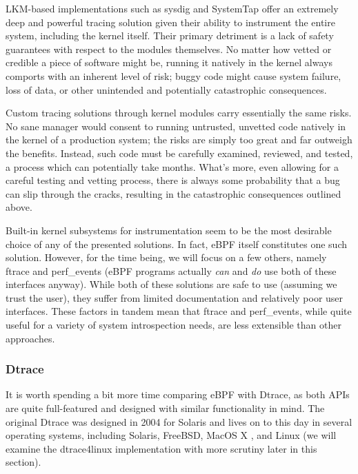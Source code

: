 \documentclass[
  12pt]{findlay}
\begin{document}
LKM-based implementations such as sysdig \autocite{sysdig} and SystemTap
\autocite{systemtap} offer an extremely deep and powerful tracing
solution given their ability to instrument the entire system, including
the kernel itself. Their primary detriment is a lack of safety
guarantees with respect to the modules themselves. No matter how vetted
or credible a piece of software might be, running it natively in the
kernel always comports with an inherent level of risk; buggy code might
cause system failure, loss of data, or other unintended and potentially
catastrophic consequences.

Custom tracing solutions through kernel modules carry essentially the
same risks. No sane manager would consent to running untrusted, unvetted
code natively in the kernel of a production system; the risks are simply
too great and far outweigh the benefits. Instead, such code must be
carefully examined, reviewed, and tested, a process which can
potentially take months. What's more, even allowing for a careful
testing and vetting process, there is always some probability that a bug
can slip through the cracks, resulting in the catastrophic consequences
outlined above.

Built-in kernel subsystems for instrumentation seem to be the most
desirable choice of any of the presented solutions. In fact, eBPF
\autocite{starovoitov13,starovoitov14} itself constitutes one such
solution. However, for the time being, we will focus on a few others,
namely ftrace \autocite{ftrace} and perf\_events
\autocite{manperfeventopen} (eBPF programs actually \emph{can} and
\emph{do} use both of these interfaces anyway). While both of these
solutions are safe to use (assuming we trust the user), they suffer from
limited documentation and relatively poor user interfaces. These factors
in tandem mean that ftrace and perf\_events, while quite useful for a
variety of system introspection needs, are less extensible than other
approaches.

\hypertarget{dtrace}{%
\subsubsection{Dtrace}\label{dtrace}}

It is worth spending a bit more time comparing eBPF with Dtrace, as both
APIs are quite full-featured and designed with similar functionality in
mind. The original Dtrace \autocite{cantrill04} was designed in 2004 for
Solaris and lives on to this day in several operating systems, including
Solaris, FreeBSD, MacOS X \autocite{gregg14}, and Linux
\autocite{dtrace4linux} (we will examine the dtrace4linux implementation
with more scrutiny later in this section).
\end{document}
